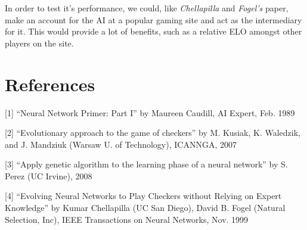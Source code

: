 \documentclass[]{article}
\begin{document}
In order to test it's performance, we could, like \emph{Chellapilla} and
\emph{Fogel's} paper, make an account for the AI at a popular gaming
site and act as the intermediary for it. This would provide a lot of
benefits, such as a relative ELO amongst other players on the site.

\section{References}\label{references}

{[}1{]} ``Neural Network Primer: Part I'' by Maureen Caudill, AI Expert,
Feb. 1989

{[}2{]} ``Evolutionary approach to the game of checkers'' by M. Kusiak,
K. Waledzik, and J. Mandziuk (Warsaw U. of Technology), ICANNGA, 2007

{[}3{]} ``Apply genetic algorithm to the learning phase of a neural
network'' by S. Perez (UC Irvine), 2008

{[}4{]} ``Evolving Neural Networks to Play Checkers without Relying on
Expert Knowledge'' by Kumar Chellapilla (UC San Diego), David B. Fogel
(Natural Selection, Inc), IEEE Transactions on Neural Networks, Nov.
1999
\end{document}

